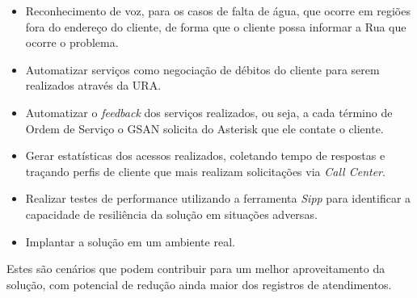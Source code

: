 \begin{itemize}
	\item Reconhecimento de voz, para os casos de falta de água, que ocorre em regiões fora do endereço do cliente, de forma que o cliente possa informar a Rua que ocorre o problema.
	\item Automatizar serviços como negociação de débitos do cliente para serem realizados através da URA.
	\item Automatizar o \textit{feedback} dos serviços realizados, ou seja, a cada término de Ordem de Serviço o GSAN solicita do Asterisk que ele contate o cliente.
	\item Gerar estatísticas dos acessos realizados, coletando tempo de respostas e traçando perfis de cliente que mais realizam solicitações via \textit{Call Center}.
	\item Realizar testes de performance utilizando a ferramenta \textit{Sipp} para identificar a capacidade de resiliência da solução em situações adversas. 
	\item Implantar a solução em um ambiente real.
\end{itemize}


Estes são cenários que podem contribuir para um melhor aproveitamento da solução, com potencial de redução ainda maior dos registros de atendimentos. 
